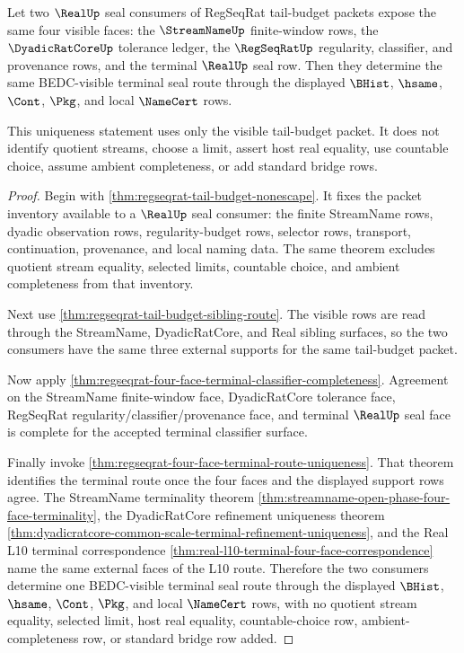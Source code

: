 \begin{theorem}
\label{thm:regseqrat-tail-budget-four-face-uniqueness}
Let two $\RealUp$ seal consumers of RegSeqRat tail-budget packets expose the same four visible faces: the $\StreamNameUp$ finite-window rows, the $\DyadicRatCoreUp$ tolerance ledger, the $\RegSeqRatUp$ regularity, classifier, and provenance rows, and the terminal $\RealUp$ seal row. Then they determine the same BEDC-visible terminal seal route through the displayed $\BHist$, $\hsame$, $\Cont$, $\Pkg$, and local $\NameCert$ rows.

This uniqueness statement uses only the visible tail-budget packet. It does not identify quotient streams, choose a limit, assert host real equality, use countable choice, assume ambient completeness, or add standard bridge rows.
\end{theorem}
\begin{proof}
Begin with \autoref{thm:regseqrat-tail-budget-nonescape}. It fixes the packet inventory available to a $\RealUp$ seal consumer: the finite StreamName rows, dyadic observation rows, regularity-budget rows, selector rows, transport, continuation, provenance, and local naming data. The same theorem excludes quotient stream equality, selected limits, countable choice, and ambient completeness from that inventory.

Next use \autoref{thm:regseqrat-tail-budget-sibling-route}. The visible rows are read through the StreamName, DyadicRatCore, and Real sibling surfaces, so the two consumers have the same three external supports for the same tail-budget packet.

Now apply \autoref{thm:regseqrat-four-face-terminal-classifier-completeness}. Agreement on the StreamName finite-window face, DyadicRatCore tolerance face, RegSeqRat regularity/classifier/provenance face, and terminal $\RealUp$ seal face is complete for the accepted terminal classifier surface.

Finally invoke \autoref{thm:regseqrat-four-face-terminal-route-uniqueness}. That theorem identifies the terminal route once the four faces and the displayed support rows agree. The StreamName terminality theorem \autoref{thm:streamname-open-phase-four-face-terminality}, the DyadicRatCore refinement uniqueness theorem \autoref{thm:dyadicratcore-common-scale-terminal-refinement-uniqueness}, and the Real L10 terminal correspondence \autoref{thm:real-l10-terminal-four-face-correspondence} name the same external faces of the L10 route. Therefore the two consumers determine one BEDC-visible terminal seal route through the displayed $\BHist$, $\hsame$, $\Cont$, $\Pkg$, and local $\NameCert$ rows, with no quotient stream equality, selected limit, host real equality, countable-choice row, ambient-completeness row, or standard bridge row added.
\end{proof}
